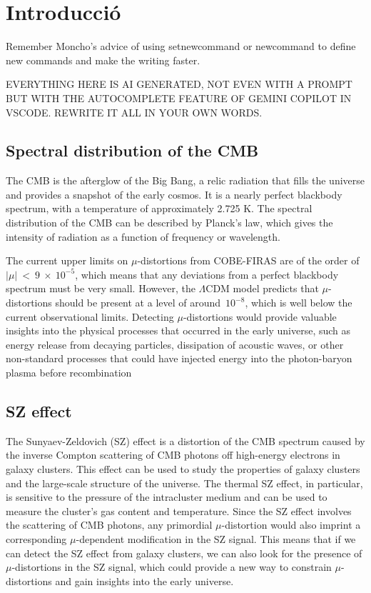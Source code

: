 
\chapter{Introducció} \label{sec:intro}

Remember Moncho's advice of using setnewcommand or newcommand to define new commands and make the writing faster.

EVERYTHING HERE IS AI GENERATED, NOT EVEN WITH A PROMPT BUT WITH THE AUTOCOMPLETE FEATURE OF GEMINI COPILOT IN VSCODE. REWRITE IT ALL IN YOUR OWN WORDS.

\section{Spectral distribution of the CMB}
The CMB is the afterglow of the Big Bang, a relic radiation that fills the universe and provides a snapshot of the early cosmos.
It is a nearly perfect blackbody spectrum, with a temperature of approximately 2.725 K.
The spectral distribution of the CMB can be described by Planck's law, which gives the intensity of radiation as a function of frequency or wavelength.

The current upper limits on $\mu$-distortions from COBE-FIRAS are of the order of $|\mu|~<~9~\times~10^{-5}$, which means that any deviations from a perfect blackbody spectrum must be very small.
However, the $\Lambda$CDM model predicts that $\mu$-distortions should be present at a level of around~$10^{-8}$, which is well below the current observational limits.
Detecting $\mu$-distortions would provide valuable insights into the physical processes that occurred in the early universe,
such as energy release from decaying particles, dissipation of acoustic waves, or other non-standard processes that could have injected energy into the photon-baryon plasma before recombination



\section{SZ effect}
The Sunyaev-Zeldovich (SZ) effect is a distortion of the CMB spectrum caused by the inverse Compton scattering of CMB photons off high-energy electrons in galaxy clusters.
This effect can be used to study the properties of galaxy clusters and the large-scale structure of the universe.
The thermal SZ effect, in particular, is sensitive to the pressure of the intracluster medium and can be used to measure the cluster's gas content and temperature.
Since the SZ effect involves the scattering of CMB photons, any primordial $\mu$-distortion would also imprint a corresponding $\mu$-dependent modification in the SZ signal.
This means that if we can detect the SZ effect from galaxy clusters, we can also look for the presence of $\mu$-distortions in the SZ signal,
which could provide a new way to constrain $\mu$-distortions and gain insights into the early universe.



